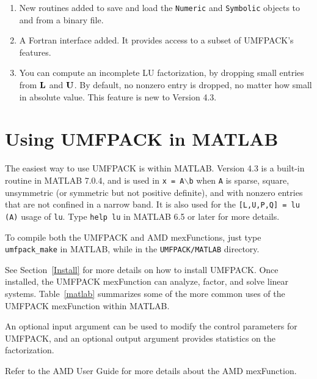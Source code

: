 \documentclass[11pt]{article}
\newcommand{\m}[1]{{\bf{#1}}}       %
\begin{document}
\begin{enumerate}
\item New routines added to save and load the {\tt Numeric} and {\tt Symbolic}
    objects to and from a binary file.

\item A Fortran interface added.  It provides access to a subset of
    UMFPACK's features.

\item You can compute an incomplete LU factorization, by dropping small
    entries from $\m{L}$ and $\m{U}$.  By default, no nonzero entry is
    dropped, no matter how small in absolute value.  This feature is new
    to Version 4.3.

\end{enumerate}

\section{Using UMFPACK in MATLAB}

The easiest way to use UMFPACK is within MATLAB.  Version 4.3 is a built-in
routine in MATLAB 7.0.4, and is used in {\tt x = A}$\backslash${\tt b} when
{\tt A} is sparse, square, unsymmetric (or symmetric but not positive definite),
and with nonzero entries that are not confined in a narrow band.
It is also used for the {\tt [L,U,P,Q] = lu (A)} usage of {\tt lu}.
Type {\tt help lu} in MATLAB 6.5 or later for more details.

To compile both the UMFPACK and AMD mexFunctions, just type {\tt umfpack\_make}
in MATLAB, while in the {\tt UMFPACK/MATLAB} directory.

See Section~\ref{Install} for more details on how to install UMFPACK.
Once installed, the UMFPACK mexFunction can analyze, factor, and solve linear
systems.  Table~\ref{matlab} summarizes some of the more common uses
of the UMFPACK mexFunction within MATLAB.

An optional input argument can be used to modify the control parameters for
UMFPACK, and an optional output argument provides statistics on the 
factorization.

Refer to the AMD User Guide for more details about the AMD mexFunction.
\end{document}
